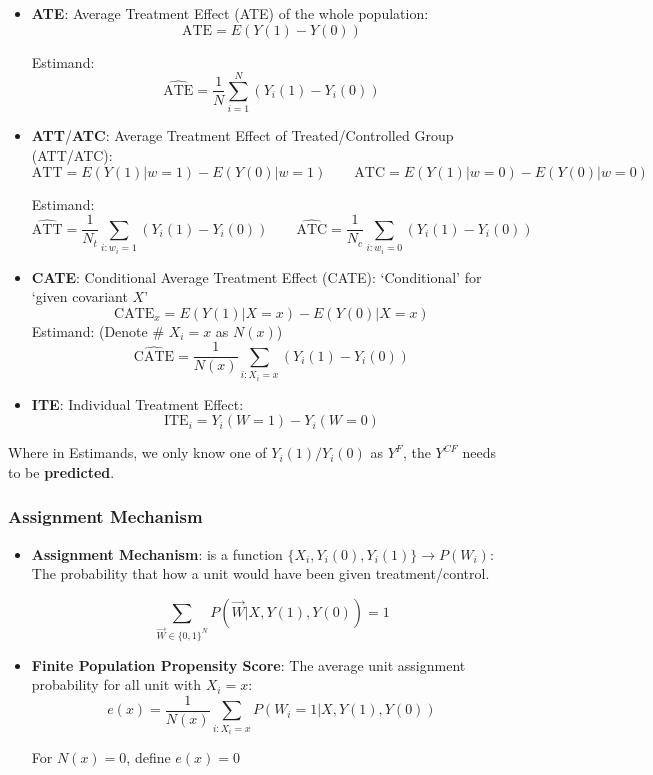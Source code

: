 \begin{itemize}[topsep=2pt,itemsep=0pt]
    \item \textbf{ATE}: Average Treatment Effect (ATE) of the whole population:
    \[
        \mathrm{ATE}=E(Y(1)-Y(0))  
    \]

    Estimand:
    \[
        \hat{\mathrm{ATE} }=\dfrac{1}{N}\sum_{i=1}^N(Y_i(1)-Y_i(0)) 
    \]

    \item \textbf{ATT}/\textbf{ATC}: Average Treatment Effect of Treated/Controlled Group (ATT/ATC):
    \[
        \mathrm{ATT}=E(Y(1)|w=1)-E(Y(0)|w=1)  \qquad \mathrm{ATC}=E(Y(1)|w=0)-E(Y(0)|w=0) 
    \]

    Estimand:
    \[
        \hat{\mathrm{ATT} }=\dfrac{1}{N_t}\sum_{i:w_i=1}(Y_i(1)-Y_i(0))\qquad \hat{\mathrm{ATC} }=\dfrac{1}{N_c}\sum_{i:w_i=0}(Y_i(1)-Y_i(0)) 
    \]
    
    
    \item \textbf{CATE}: Conditional Average Treatment Effect (CATE): `Conditional' for `given covariant $ X $'
    \[
        \mathrm{CATE}_x=E(Y(1)|X=x)-E(Y(0)|X=x)
    \]
    Estimand: (Denote \# $ X_i=x $ as $ N(x) $)
    \[
        \hat{\mathrm{CATE} }=\dfrac{1}{N(x)}\sum_{i:X_i=x}(Y_i(1)-Y_i(0)) 
    \]
    
    
    \item \textbf{ITE}: Individual Treatment Effect:
    \[
        \mathrm{ITE}_i=Y_i(W=1)-Y_i(W=0)  
    \]
\end{itemize}

    Where in Estimands, we only know one of $ Y_i(1)/Y_i(0) $ as $ Y^F $, the $ Y^{CF} $ needs to be \textbf{predicted}. 

    



\subsubsection{Assignment Mechanism}
\begin{itemize}[topsep=2pt,itemsep=0pt]
    \item  \textbf{Assignment Mechanism}: is a function $ \{X_i,Y_i(0),Y_i(1)\}\to P(W_i) $: The probability that how a unit would have been given treatment/control.

\[
    \sum_{\vec{W}\in \{0,1\}^N}P(\vec{W}|X,Y(1),Y(0))=1 
\]

    \item \textbf{Finite Population Propensity Score}: The average unit assignment probability for all unit with $ X_i=x $:
    \[
        e(x)=\dfrac{1}{N(x)}\sum_{i:X_i=x}P(W_i=1|X,Y(1),Y(0))
    \]

    For $ N(x)=0 $, define $ e(x)=0 $
    
    
\end{itemize}

